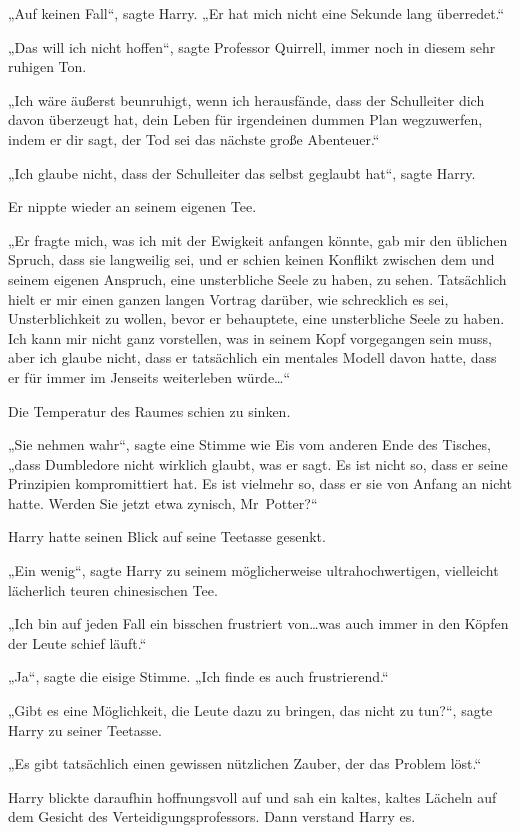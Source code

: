 {„Auf keinen Fall“, sagte Harry. „Er hat mich nicht eine Sekunde lang überredet.“

„Das will ich nicht hoffen“, sagte Professor Quirrell, immer noch in diesem sehr ruhigen Ton.

„Ich wäre äußerst beunruhigt, wenn ich herausfände, dass der Schulleiter dich davon überzeugt hat, dein Leben für irgendeinen dummen Plan wegzuwerfen, indem er dir sagt, der Tod sei das nächste große Abenteuer.“

„Ich glaube nicht, dass der Schulleiter das selbst geglaubt hat“, sagte Harry.

Er nippte wieder an seinem eigenen Tee.

„Er fragte mich, was ich mit der Ewigkeit anfangen könnte, gab mir den üblichen Spruch, dass sie langweilig sei, und er schien keinen Konflikt zwischen dem und seinem eigenen Anspruch, eine unsterbliche Seele zu haben, zu sehen. Tatsächlich hielt er mir einen ganzen langen Vortrag darüber, wie schrecklich es sei, Unsterblichkeit zu wollen, bevor er behauptete, eine unsterbliche Seele zu haben. Ich kann mir nicht ganz vorstellen, was in seinem Kopf vorgegangen sein muss, aber ich glaube nicht, dass er tatsächlich ein mentales Modell davon hatte, dass er für immer im Jenseits weiterleben würde…“

Die Temperatur des Raumes schien zu sinken.

„Sie nehmen wahr“, sagte eine Stimme wie Eis vom anderen Ende des Tisches, „dass Dumbledore nicht wirklich glaubt, was er sagt. Es ist nicht so, dass er seine Prinzipien kompromittiert hat. Es ist vielmehr so, dass er sie von Anfang an nicht hatte. Werden Sie jetzt etwa zynisch, Mr~Potter?“

Harry hatte seinen Blick auf seine Teetasse gesenkt.

„Ein wenig“, sagte Harry zu seinem möglicherweise ultrahochwertigen, vielleicht lächerlich teuren chinesischen Tee.

„Ich bin auf jeden Fall ein bisschen frustriert von…was auch immer in den Köpfen der Leute schief läuft.“

„Ja“, sagte die eisige Stimme. „Ich finde es auch frustrierend.“

„Gibt es eine Möglichkeit, die Leute dazu zu bringen, das nicht zu tun?“, sagte Harry zu seiner Teetasse.

„Es gibt tatsächlich einen gewissen nützlichen Zauber, der das Problem löst.“

Harry blickte daraufhin hoffnungsvoll auf und sah ein kaltes, kaltes Lächeln auf dem Gesicht des Verteidigungsprofessors. Dann verstand Harry es.

}
